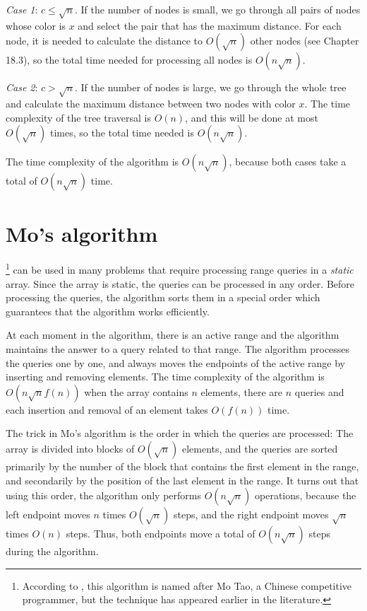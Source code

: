 \emph{Case 1}: $c \le \sqrt n$.
If the number of nodes is small,
we go through all pairs of nodes whose
color is $x$ and select the pair that
has the maximum distance.
For each node, it is needed to calculate the distance
to $O(\sqrt n)$ other nodes (see Chapter 18.3),
so the total time needed for processing all
nodes is $O(n \sqrt n)$.

\emph{Case 2}: $c > \sqrt n$.
If the number of nodes is large,
we go through the whole tree
and calculate the maximum distance between
two nodes with color $x$.
The time complexity of the tree traversal is $O(n)$,
and this will be done at most $O(\sqrt n)$ times,
so the total time needed is $O(n \sqrt n)$.

The time complexity of the algorithm is $O(n \sqrt n)$,
because both cases take a total of $O(n \sqrt n)$ time.

\section{Mo's algorithm}


\footnote{According to \cite{cod15}, this algorithm
is named after Mo Tao, a Chinese competitive programmer, but
the technique has appeared earlier in the literature.} can be used in many problems
that require processing range queries in 
a \emph{static} array.
Since the array is static, the queries can be
processed in any order.
Before processing the queries, the algorithm
sorts them in a special order which guarantees
that the algorithm works efficiently.

At each moment in the algorithm, there is an active
range and the algorithm maintains the answer
to a query related to that range.
The algorithm processes the queries one by one,
and always moves the endpoints of the
active range by inserting and removing elements.
The time complexity of the algorithm is
$O(n \sqrt n f(n))$ when the array contains
$n$ elements, there are $n$ queries
and each insertion and removal of an element
takes $O(f(n))$ time.

The trick in Mo's algorithm is the order
in which the queries are processed:
The array is divided into blocks of $O(\sqrt n)$
elements, and the queries are sorted primarily by
the number of the block that contains the first element
in the range, and secondarily by the position of the
last element in the range.
It turns out that using this order, the algorithm
only performs $O(n \sqrt n)$ operations,
because the left endpoint moves
$n$ times $O(\sqrt n)$ steps,
and the right endpoint moves
$\sqrt n$ times $O(n)$ steps. Thus, both
endpoints move a total of $O(n \sqrt n)$ steps during the algorithm.


